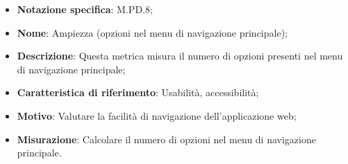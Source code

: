 \begin{itemize}
    \item \textbf{Notazione specifica}: M.PD.8;
    \item \textbf{Nome}: Ampiezza (opzioni nel menu di navigazione principale);
    \item \textbf{Descrizione}: Questa metrica misura il numero di opzioni presenti nel menu di navigazione principale;
    \item \textbf{Caratteristica di riferimento}: Usabilità, accessibilità;
    \item \textbf{Motivo}: Valutare la facilità di navigazione dell'applicazione web;
    \item \textbf{Misurazione}: Calcolare il numero di opzioni nel menu di navigazione principale.
\end{itemize}
